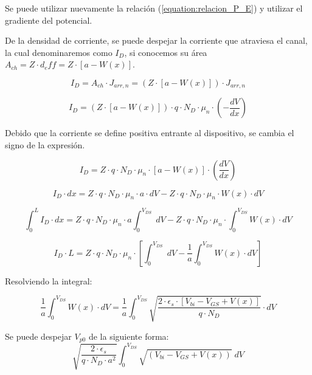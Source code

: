 \documentclass[a4paper]{article}
\begin{document}
Se puede utilizar nuevamente la relación (\ref{equation:relacion_P_E}) y utilizar el gradiente del potencial.

De la densidad de corriente, se puede despejar la corriente que atraviesa el canal, la cual denominaremos como $I_D$, si conocemos su área $A_{ch} = Z \cdot d_eff = Z\cdot [a - W(x)]$.

\begin{equation}
	I_D =A_{ch}\cdot J_{arr, n} = (Z\cdot [a - W(x)]) \cdot J_{arr, n} 
\end{equation}


\begin{equation}
	I_D = (Z\cdot [a - W(x)]) \cdot q \cdot N_D \cdot \mu_n \cdot (- \frac{dV}{dx})
\end{equation}

Debido que la corriente se define positiva entrante al dispositivo, se cambia el signo de la expresión.

\begin{equation}
		I_D =  Z \cdot q \cdot N_D \cdot \mu_n \cdot[a - W(x)] \cdot ( \frac{dV}{dx})
\end{equation}


\begin{equation}
	I_D \cdot dx = Z\cdot q \cdot N_D \cdot \mu_n \cdot a \cdot dV - Z\cdot q \cdot N_D \cdot \mu_n \cdot W(x) \cdot dV  
\end{equation}

\begin{equation}
	\int_0^L I_D \cdot dx =  Z\cdot q \cdot N_D \cdot \mu_n \cdot a 	\int_0^{V_{DS}}  \; dV - Z\cdot q \cdot N_D \cdot \mu_n \cdot 	\int_0^{V_{DS}}  W(x) \cdot dV 
\end{equation}



\begin{equation}
	 I_D \cdot L = Z\cdot q \cdot N_D \cdot \mu_n \cdot 	\left[ 	\int_0^{V_{DS}}  \; dV -  \frac{1}{a} \int_0^{V_{DS}}  W(x) \cdot dV\right]   
\end{equation}

Resolviendo la integral:

\begin{equation}
 \frac{1}{a}	\int_0^{V_{DS}}  W(x) \cdot dV =  \frac{1}{a}	\int_0^{V_{DS}} \sqrt{\frac{2 \cdot \epsilon_s \cdot [  V_{bi} - V_{GS} + V(x)] }{q\cdot N_D}}\cdot dV
\end{equation}

Se puede despejar $V_{p0}$ de la siguiente forma: 
\begin{equation}
  \sqrt{ \frac{2 \cdot \epsilon_s}{q\cdot N_D \cdot a^2}}	\int_0^{V_{DS}} \sqrt{ (V_{bi} - V_{GS} + V(x))} \; dV
\end{equation}
\end{document}
